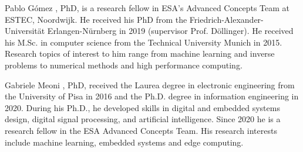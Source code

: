 \documentclass[journal]{IEEEtran}
\newcommand{\gomez}{G\'{o}mez}
\begin{document}
\FloatBarrier






\begin{IEEEbiography}{Pablo \gomez}
, PhD, is a research fellow in ESA's Advanced Concepts Team at ESTEC, Noordwijk. He received his PhD from the Friedrich-Alexander-Universit\"at Erlangen-N\"urnberg in 2019 (supervisor Prof. D\"ollinger). He received his M.Sc. in computer science from the Technical University Munich in 2015. Research topics of interest to him range from machine learning and inverse  problems to numerical methods and high performance computing.
\end{IEEEbiography}

\begin{IEEEbiography}{Gabriele Meoni}
, PhD, received the Laurea degree in electronic engineering from the University of Pisa in 2016 and the Ph.D. degree in information engineering in 2020. During his Ph.D., he developed skills in digital and embedded systems design, digital signal processing, and artificial intelligence.  
Since 2020 he is a research fellow in the ESA Advanced Concepts Team. His research interests include machine learning, embedded systems and edge computing.

\end{IEEEbiography}
\end{document}
